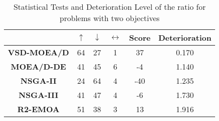 \begin{table}[t]
\centering
\caption{Statistical Tests and Deterioration Level of the \HV{} ratio for problems with two objectives}
\label{tab:Tests_HV_2obj}
\begin{tabular}{c c|c|c|c|c}
\cline{2-6}
 & \textbf{$\uparrow$} & \textbf{$\downarrow$} & \textbf{$\leftrightarrow$} & \textbf{Score} & \textbf{Deterioration} \\ \hline
\multicolumn{1}{c|}{\textbf{VSD-MOEA/D}} & 64 & 27 & 1 & 37 & 0.170 \\ \hline
\multicolumn{1}{c|}{\textbf{MOEA/D-DE}} & 41 & 45 & 6 & -4 & 1.140 \\ \hline
\multicolumn{1}{c|}{\textbf{NSGA-II}} & 24 & 64 & 4 & -40 & 1.235 \\ \hline
\multicolumn{1}{c|}{\textbf{NSGA-III}} & 41 & 47 & 4 & -6 & 1.730 \\ \hline
\multicolumn{1}{c|}{\textbf{R2-EMOA}} & 51 & 38 & 3 & 13 & 1.916 \\ \hline
\end{tabular}%
\end{table}

%


%
